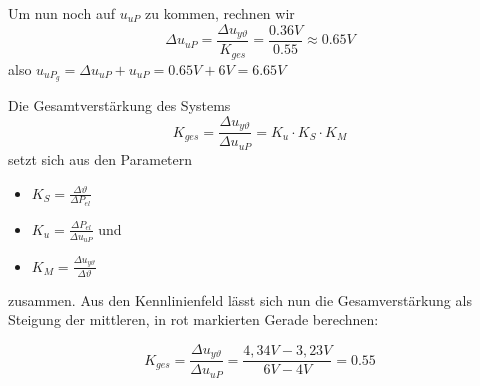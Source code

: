 \documentclass{report}
\begin{document}
Um nun noch auf $u_{uP}$ zu kommen, rechnen wir
\begin{equation*}
  \Delta u_{uP} = \frac{\Delta u_{y\vartheta}}{K_{ges}} = \frac{0.36V}{0.55} \approx 0.65V
\end{equation*}
also $u_{uP}_{g} = \Delta u_{uP} + u_{uP} = 0.65V + 6V = 6.65V$

Die Gesamtverstärkung des Systems
\begin{equation}
  \label{eq:11}
  K_{ges} = \frac{\Delta u_{y\vartheta}}{\Delta u_{uP}} = K_{u} \cdot K_{S} \cdot K_{M}
\end{equation}
setzt sich aus den Parametern

\begin{itemize}
  \item $K_{S} = \frac{\Delta \vartheta}{\Delta P_{el}}$

  \item $K_{u} = \frac{\Delta P_{el}}{\Delta u_{uP}}$ und
  \item $K_{M} = \frac{\Delta u_{y\vartheta}}{\Delta \vartheta}$
\end{itemize}
zusammen. Aus den Kennlinienfeld lässt sich nun die Gesamverstärkung als Steigung der mittleren, in rot markierten Gerade berechnen:

\begin{equation*}
  K_{ges} = \frac{\Delta u_{y\vartheta}}{\Delta u_{uP}} = \frac{4,34V - 3,23V}{6V-4V} = 0.55
\end{equation*}
\end{document}
